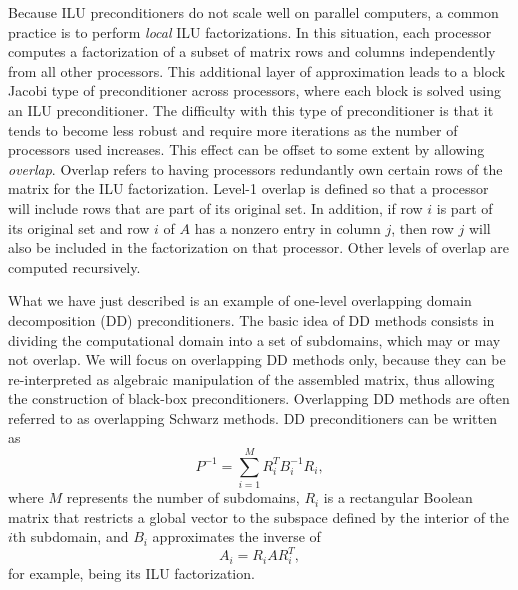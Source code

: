 \documentclass[10pt,relax]{SANDreport}
\begin{document}
Because ILU preconditioners do not scale well on parallel computers, a common
practice is to perform {\em local} ILU factorizations.  In this situation,
each processor computes a factorization of a subset of matrix rows and
columns independently from all other processors.  This additional layer of
approximation leads to a block Jacobi type of preconditioner across
processors, where each block is solved using an ILU preconditioner.  The
difficulty with this type of preconditioner is that it tends to become less
robust and require more iterations as the number of processors used
increases.  This effect can be offset to some extent by allowing {\em
overlap}.  Overlap refers to having processors redundantly own certain
rows of the matrix for the ILU factorization.  Level-1 overlap is defined
so that a processor will include rows that are part of its original set.
In addition, if row $i$ is part of its original set and row $i$ of $A$ has
a nonzero entry in column $j$, then row $j$ will also be included in the
factorization on that processor.  Other levels of overlap are computed
recursively. 

What we have just described is an example of one-level overlapping domain
decomposition (DD) preconditioners.  The basic idea of DD methods consists in
dividing the computational domain into a set of subdomains, which may or may
not overlap. We will focus on overlapping DD methods only, because they can be
re-interpreted as algebraic manipulation of the assembled matrix, thus
allowing the construction of black-box preconditioners. Overlapping DD methods
are often referred to as overlapping Schwarz methods. DD preconditioners can
be written as
\begin{equation}
  \label{eq:prec_dd}
  P^{-1} = \sum_{i=1}^M R_i^T B_i^{-1} R_i,
\end{equation}
where $M$ represents the number of subdomains,
$R_i$ is a rectangular Boolean matrix that restricts
a global vector to the subspace defined by the interior of the $i$th
subdomain, and $B_i$ approximates the inverse of 
\begin{equation}
  \label{eq:aztecoo_tilde_a}
  A_i = R_i A R_i^T ,
\end{equation}
for example, being its ILU factorization.
\end{document}
